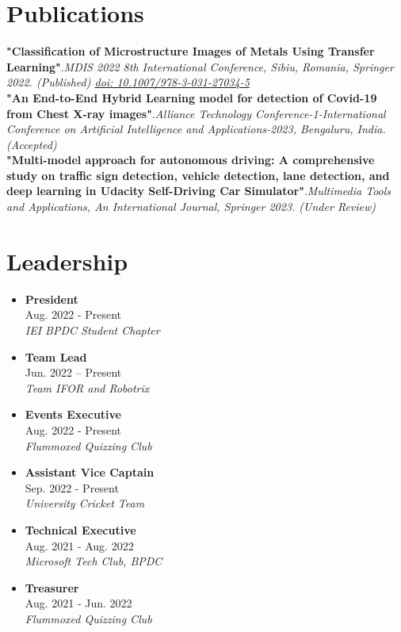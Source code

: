 \documentclass[a4paper,11pt]{article}
\newcommand{\resumeLeadership}[3]{
  \item
      \textbf{#1}\\#2 \\
      \textit{\small#3}\\

}
\begin{document}
\vspace{-1mm}

\section{Publications}

\vspace{1mm}

\small{
	\textbf{"Classification of Microstructure Images of Metals Using Transfer Learning"}.\textit{MDIS 2022 8th International Conference, Sibiu, Romania, Springer 2022. (Published) \href{https://doi.org/10.1007/978-3-031-27034-5_9}{doi: 10.1007/978-3-031-27034-5}}\\
    \vspace{1mm}
    \textbf{"An End-to-End Hybrid Learning model for detection of Covid-19 from Chest X-ray images"}.\textit{Alliance Technology Conference-1-International Conference on Artificial Intelligence and Applications-2023, Bengaluru, India. (Accepted)}\\
    \vspace{1mm}
    \textbf{"Multi-model approach for autonomous driving: A comprehensive study on traffic sign detection, vehicle detection, lane detection, and deep learning in Udacity Self-Driving Car Simulator"}.\textit{Multimedia Tools and Applications, An International Journal, Springer 2023. (Under Review)}\\
    
}
\vspace{-1.5mm}

\section{Leadership}

\vspace{0.5mm}

\vspace{-15pt}
\begin{multicols}{3}
	\begin{itemize}
		\resumeLeadership{President}{Aug. 2022 - Present}{IEI BPDC Student Chapter}
		\resumeLeadership{Team Lead}{Jun. 2022 – Present}{Team IFOR and Robotrix}
        \resumeLeadership{Events Executive}{Aug. 2022 - Present}{Flummoxed Quizzing Club}
        \resumeLeadership{Assistant Vice Captain}{Sep. 2022 - Present}{University Cricket Team}
		\resumeLeadership{Technical Executive}{Aug. 2021 - Aug. 2022}{Microsoft Tech Club, BPDC}
		\resumeLeadership{Treasurer}{Aug. 2021 - Jun. 2022}{Flummoxed Quizzing Club}
	\end{itemize}
\end{multicols}
\end{document}
